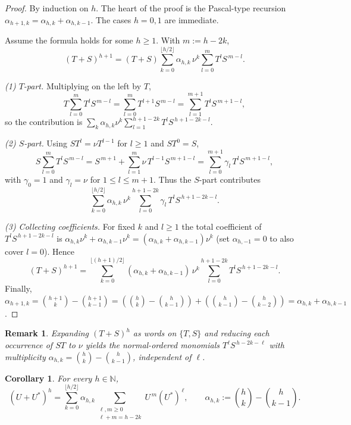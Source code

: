 \documentclass[10pt]{amsart}
\newcommand{\1}{{\mathbb{I}}}
\numberwithin{equation}{section}
\newtheorem{remark}[theorem]{Remark}%
\newtheorem{corollary}[theorem]{Corollary}%
\begin{document}
\begin{proof}
By induction on $h$. The heart of the proof is the Pascal-type recursion
$\alpha_{h+1,k}=\alpha_{h,k}+\alpha_{h,k-1}$. The cases $h=0,1$ are immediate.

Assume the formula holds for some $h\ge1$. With $m:=h-2k$,
\[
(T+S)^{h+1}
=(T+S)\sum_{k=0}^{\lfloor h/2\rfloor}\alpha_{h,k}\,\nu^k\sum_{l=0}^{m}T^l S^{\,m-l}.
\]

\emph{(1) $T$-part.} Multiplying on the left by $T$,
\[
T\sum_{l=0}^{m}T^l S^{\,m-l}
=\sum_{l=0}^{m}T^{l+1} S^{\,m-l}
=\sum_{l=1}^{m+1}T^{l} S^{\,m+1-l},
\]
so the contribution is $\sum_{k}\alpha_{h,k}\nu^k\sum_{l=1}^{h+1-2k}T^{l} S^{\,h+1-2k-l}$.

\emph{(2) $S$-part.} Using $ST^l=\nu T^{l-1}$ for $l\ge1$ and $ST^0=S$,
\[
S\sum_{l=0}^{m}T^l S^{\,m-l}
= S^{\,m+1}
+\sum_{l=1}^{m}\nu\,T^{l-1} S^{\,m+1-l}
= \sum_{l=0}^{m+1}\gamma_l\,T^{l} S^{\,m+1-l},
\]
with $\gamma_0=1$ and $\gamma_l=\nu$ for $1\le l\le m+1$. Thus the $S$-part contributes
\[
\sum_{k=0}^{\lfloor h/2\rfloor}\alpha_{h,k}\,\nu^k
\sum_{l=0}^{h+1-2k} \gamma_l\,T^l S^{\,h+1-2k-l}.
\]

\emph{(3) Collecting coefficients.} For fixed $k$ and $l\ge1$ the total coefficient of $T^l S^{\,h+1-2k-l}$
is $\alpha_{h,k}\nu^k+\alpha_{h,k-1}\nu^k=(\alpha_{h,k}+\alpha_{h,k-1})\nu^k$ (set $\alpha_{h,-1}=0$ to also cover $l=0$).
Hence
\[
(T+S)^{h+1}
=\sum_{k=0}^{\lfloor (h+1)/2\rfloor}(\alpha_{h,k}+\alpha_{h,k-1})\,\nu^k
\sum_{l=0}^{h+1-2k}T^l S^{\,h+1-2k-l}.
\]
Finally, $\alpha_{h+1,k}=\binom{h+1}{k}-\binom{h+1}{k-1}
=(\binom{h}{k}-\binom{h}{k-1})+(\binom{h}{k-1}-\binom{h}{k-2})
=\alpha_{h,k}+\alpha_{h,k-1}$.
\end{proof}

\begin{remark}
Expanding $(T+S)^h$ as words on $\{T,S\}$ and reducing each occurrence of $ST$ to $\nu$ yields the normal-ordered monomials $T^\ell S^{\,h-2k-\ell}$ with multiplicity
$\alpha_{h,k}=\binom{h}{k}-\binom{h}{k-1}$, independent of $\ell$.
\end{remark}

\begin{corollary}\label{lem:TS-normal}
For every $h\in\mathbb{N}$,
\[
(U+U^*)^{h}
=\sum_{k=0}^{\lfloor h/2\rfloor} \alpha_{h,k}
\sum_{\substack{\ell,m\ge 0\\ \ell+m = h - 2k}} U^{\,m}(U^*)^{\,\ell},
\qquad
\alpha_{h,k}:=\binom{h}{k}-\binom{h}{k-1}.
\]
\end{corollary}
\end{document}
